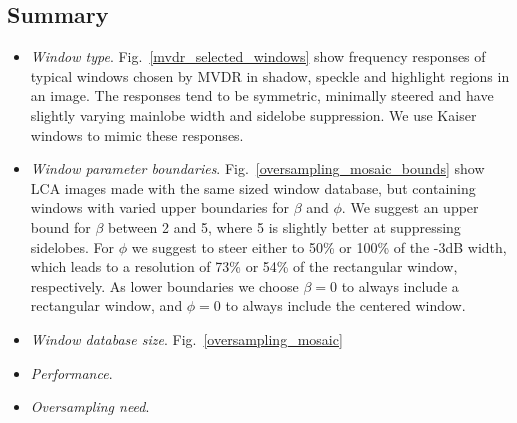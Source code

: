 \documentclass[10pt,journal,draftclsnofoot,onecolumn]{IEEEtran}
\newcommand\Fig[1]{Fig.~\ref{#1}}
\newcommand\1{\vec 1}
\begin{document}




\subsection{Summary}

\begin{itemize}
\item \emph{Window type}. \Fig{mvdr_selected_windows} show frequency responses of typical windows chosen by MVDR in shadow, speckle and highlight regions in an image. The responses tend to be symmetric, minimally steered and have slightly varying mainlobe width and sidelobe suppression. We use Kaiser windows to mimic these responses.
\item \emph{Window parameter boundaries}. \Fig{oversampling_mosaic_bounds} show LCA images made with the same sized window database, but containing windows with varied upper boundaries for $\beta$ and $\phi$. We suggest an upper bound for $\beta$ between 2 and 5, where 5 is slightly better at suppressing sidelobes. For $\phi$ we suggest to steer either to 50\% or 100\% of the -3dB width, which leads to a resolution of 73\% or 54\% of the rectangular window, respectively. As lower boundaries we choose $\beta=0$ to always include a rectangular window, and $\phi=0$ to always include the centered window.
\item \emph{Window database size}. \Fig{oversampling_mosaic}
\item \emph{Performance}.
\item \emph{Oversampling need}.
\end{itemize}
\end{document}
